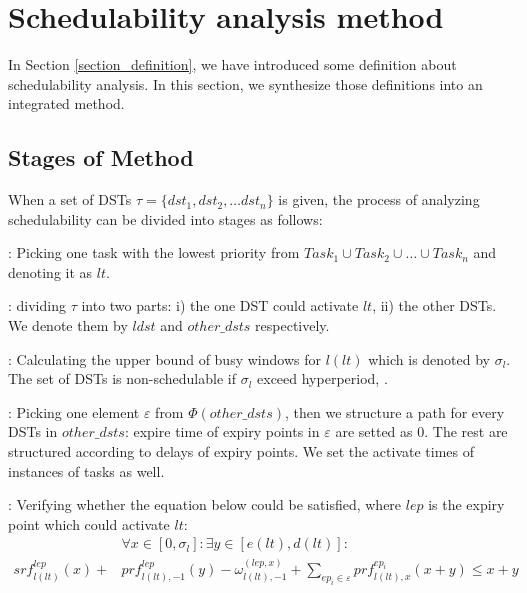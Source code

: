 \documentclass[sigconf]{acmart}
\begin{document}
\section{Schedulability analysis method}
In Section \ref{section_definition}, we have introduced some definition about schedulability analysis. In this section, we synthesize those definitions into an integrated method.

\subsection{Stages of Method}\label{section_8steps}
When a set of DSTs $\tau=\{dst_1,dst_2, \dots dst_n\}$ is given, the process of analyzing schedulability can be divided into stages as follows:
\begin{compactenum}

  \item: Picking one task with the lowest priority from $Task_1\cup Task_2\cup\dots\cup Task_n$ and denoting it as $lt$. %
  \item: dividing $\tau$ into two parts: i) the one DST could activate $lt$, ii) the other DSTs. We denote them by $ldst$ and $other\_dsts$ respectively. %

  \item: Calculating the upper bound of busy windows for $l(lt)$ which is denoted by $\sigma_l$. The set of DSTs is non-schedulable if $\sigma_l$ exceed hyperperiod, .%
  
  \item: Picking one element $\varepsilon$ from $\Phi(other\_dsts)$, then we structure a path for every DSTs in $other\_dsts$: expire time of expiry points in $\varepsilon$ are setted as 0. The rest are structured according to delays of expiry points. We set the activate times of instances of tasks as well.%

  \item: Verifying whether the equation below could be satisfied, where $lep$ is the expiry point which could activate $lt$:%
  \begin{equation}\begin{split}
      &\forall x\in[0,\sigma_l]:\exists y\in[e(lt),d(lt)]:\\
      srf^{lep}_{l(lt)}(x)+&prf^{lep}_{l(lt),-1}(y)-\omega^{(lep,x)}_{l(lt),-1}+\sum\limits_{ep_i\in\varepsilon}prf^{ep_i}_{l(lt),x}(x+y)\leq x+y
    \end{split}\label{equation_verify}\end{equation}
  

\end{compactenum}
\end{document}
